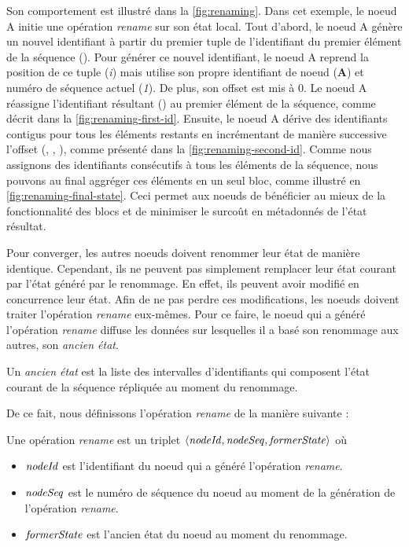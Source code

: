 Son comportement est illustré dans la \autoref{fig:renaming}.
Dans cet exemple, le noeud A initie une opération \emph{rename} sur son état local.
Tout d'abord, le noeud A génère un nouvel identifiant à partir du premier tuple de l'identifiant du premier élément de la séquence ().
Pour générer ce nouvel identifiant, le noeud A reprend la position de ce tuple (\emph{i}) mais utilise son propre identifiant de noeud (\textbf{A}) et numéro de séquence actuel (\emph{1}).
De plus, son offset est mis à 0.
Le noeud A réassigne l'identifiant résultant () au premier élément de la séquence, comme décrit dans la \autoref{fig:renaming-first-id}.
Ensuite, le noeud A dérive des identifiants contigus pour tous les éléments restants en incrémentant de manière successive l'offset (, , ), comme présenté dans la \autoref{fig:renaming-second-id}.
Comme nous assignons des identifiants consécutifs à tous les éléments de la séquence, nous pouvons au final aggréger ces éléments en un seul bloc, comme illustré en \autoref{fig:renaming-final-state}.
Ceci permet aux noeuds de bénéficier au mieux de la fonctionnalité des blocs et de minimiser le surcoût en métadonnés de l'état résultat.

Pour converger, les autres noeuds doivent renommer leur état de manière identique.
Cependant, ils ne peuvent pas simplement remplacer leur état courant par l'état généré par le renommage.
En effet, ils peuvent avoir modifié en concurrence leur état.
Afin de ne pas perdre ces modifications, les noeuds doivent traiter l'opération \emph{rename} eux-mêmes.
Pour ce faire, le noeud qui a généré l'opération \emph{rename} diffuse les données sur lesquelles il a basé son renommage aux autres, \ie son \emph{ancien état}.

\begin{definition}
  \label{def:former-state}
  Un \emph{ancien état} est la liste des intervalles d'identifiants qui composent l'état courant de la séquence répliquée au moment du renommage.
\end{definition}

De ce fait, nous définissons l'opération \emph{rename} de la manière suivante :

\begin{definition}[rename]
  \label{def:rename-op}
  Une opération \emph{rename} est un triplet $\langle \mathit{nodeId}, \mathit{nodeSeq}, \mathit{formerState} \rangle$ où
  \begin{itemize}
    \item $\mathit{nodeId}$ est l'identifiant du noeud qui a généré l'opération \emph{rename}.
    \item $\mathit{nodeSeq}$ est le numéro de séquence du noeud au moment de la génération de l'opération \emph{rename}.
    \item $\mathit{formerState}$ est l'ancien état du noeud au moment du renommage.
  \end{itemize}
\end{definition}

